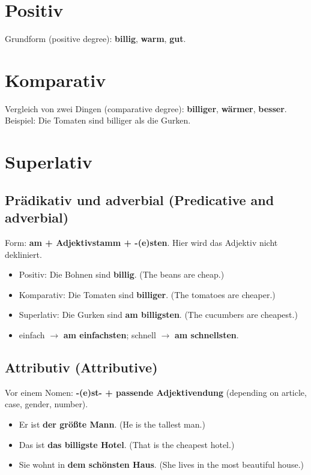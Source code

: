 \section{Positiv}
Grundform (positive degree): \textbf{billig}, \textbf{warm}, \textbf{gut}.

\section{Komparativ}
Vergleich von zwei Dingen (comparative degree): \textbf{billiger}, \textbf{wärmer}, \textbf{besser}. Beispiel: Die Tomaten sind billiger als die Gurken.

\section{Superlativ}
\subsection{Prädikativ und adverbial (Predicative and adverbial)}
Form: \textbf{am + Adjektivstamm + -(e)sten}. Hier wird das Adjektiv nicht dekliniert.
\begin{itemize}
\item Positiv: Die Bohnen sind \textbf{billig}. (The beans are cheap.)
\item Komparativ: Die Tomaten sind \textbf{billiger}. (The tomatoes are cheaper.)
\item Superlativ: Die Gurken sind \textbf{am billigsten}. (The cucumbers are cheapest.)
\item einfach $\rightarrow$ \textbf{am einfachsten}; schnell $\rightarrow$ \textbf{am schnellsten}.
\end{itemize}
\subsection{Attributiv (Attributive)}
Vor einem Nomen: \textbf{-(e)st- + passende Adjektivendung} (depending on article, case, gender, number).
\begin{itemize}
\item Er ist \textbf{der größte Mann}. (He is the tallest man.)
\item Das ist \textbf{das billigste Hotel}. (That is the cheapest hotel.)
\item Sie wohnt in \textbf{dem schönsten Haus}. (She lives in the most beautiful house.)
\end{itemize}
